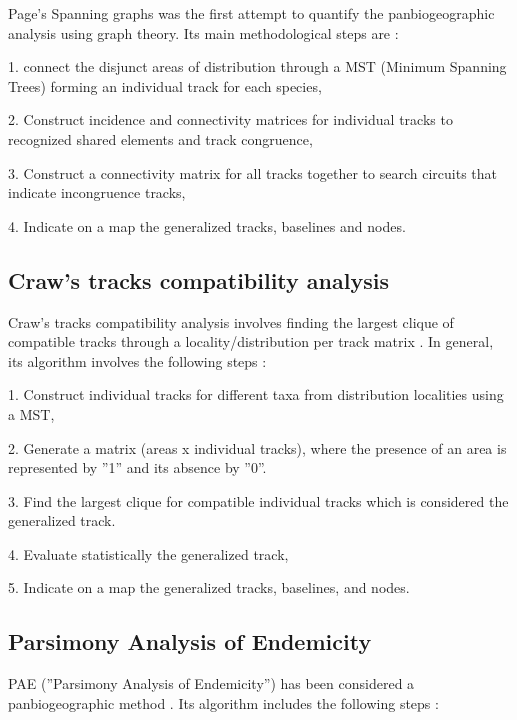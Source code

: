 Page's Spanning graphs was the first attempt to quantify the panbiogeographic
analysis using graph theory. Its main methodological steps are \citep{Page1987}:

1. connect the disjunct areas of distribution through a MST (Minimum Spanning
Trees) forming an individual track for each species,

2. Construct incidence and connectivity
matrices for individual tracks to recognized shared elements and track
congruence,

3. Construct a connectivity matrix for all tracks together to search
circuits that indicate incongruence tracks,

4. Indicate on a map the generalized
tracks, baselines and nodes.

\subsection{Craw's tracks compatibility analysis}

Craw's tracks compatibility analysis \citep{Craw1989a} involves finding the
largest clique of compatible tracks through a locality/distribution per track
matrix \citep{Crawetal1999}. In general, its algorithm involves the following
steps \citep{Craw1989a, Grehan2001c, Morrone2004c}:

1. Construct individual tracks for different taxa from distribution localities using a MST,

2. Generate a matrix  (areas x individual tracks), where the presence of an area is
represented by ''1'' and its absence by ''0''.

3. Find the largest clique for compatible individual tracks which is considered the generalized track.

4. Evaluate statistically the generalized track,

5. Indicate on a map the
generalized tracks, baselines, and nodes.


\subsection{Parsimony Analysis of Endemicity}


PAE (''Parsimony Analysis of Endemicity'') has been considered a
panbiogeographic method \citep{Crawetal1999, Luna-vegaetal2000,
MorroneMarquez2001, Morrone2004c}. Its algorithm includes the following steps
\citep {Morrone2004c}:

